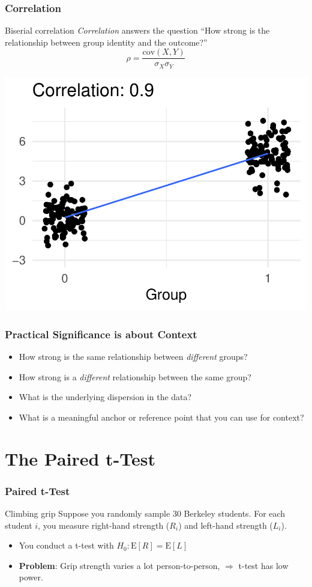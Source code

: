 \documentclass[12pt, block=fill]{beamer}
\newcommand{\E}{\text{E}}
\newcommand{\cov}{\text{cov}}
\begin{document}
\begin{frame}
  \frametitle{Correlation}

  \begin{block}{Biserial correlation}
    \textit{Correlation} answers the question ``How strong
    is the relationship between group identity and the outcome?''
    \[
      \rho = \frac{\cov(X, Y)}{\sigma_{X}\sigma_{Y}}
    \]
  \end{block}

  \begin{center}
    \includegraphics[width = 0.4\linewidth]{./figures/biserial_09}
  \end{center}
\end{frame}

\begin{frame}
  \frametitle{Practical Significance is about Context}

  \begin{itemize}
  \item How strong is the same relationship between \textit{different}
    groups?
  \item How strong is a \textit{different} relationship between the
    same group?
  \item What is the underlying dispersion in the data?
  \item What is a meaningful anchor or reference point that you can
    use for context?
  \end{itemize}
\end{frame}

\section{The Paired t-Test}

\begin{frame}
  \frametitle{Paired t-Test}

  \begin{exampleblock}{Climbing grip}
    Suppose you randomly sample 30 Berkeley students.  For each
    student $i$, you measure right-hand strength ($R_i$) and left-hand
    strength ($L_i$).

    \begin{itemize}
    \item You conduct a t-test with $H_0: \E[R] = \E[L]$
    \item \textbf{Problem}: Grip strength varies a lot
      person-to-person, $\Rightarrow$  t-test has low power.
    \end{itemize}
  \end{exampleblock}
\end{frame}
\end{document}
